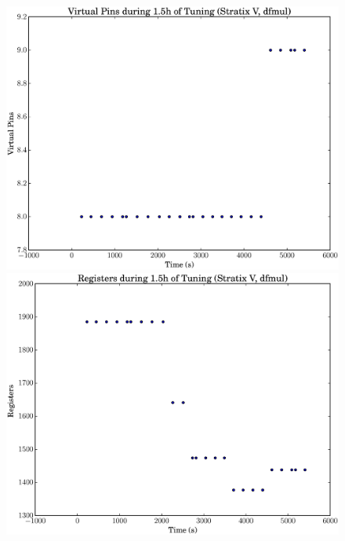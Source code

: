 \documentclass[12pt, a4paper]{article}
\begin{document}
\begin{figure}[htpb]
    \begin{minipage}{.48\textwidth}
        \includegraphics[scale=.25]{dfmul_pins_5400_chstone_StratixV}
    \end{minipage}%
    \hfill
    \begin{minipage}{.48\textwidth}
        \includegraphics[scale=.25]{dfmul_regs_5400_chstone_StratixV}
    \end{minipage}%


\end{figure}
\end{document}
